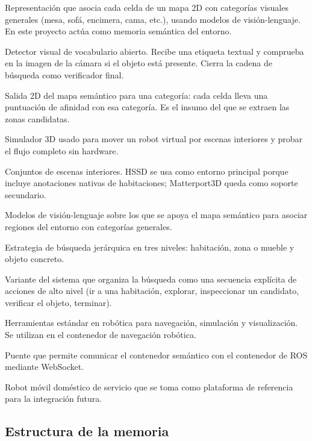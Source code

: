 \documentclass[11pt,fleqn,openany]{book} %
\begin{document}
\begin{description}[leftmargin=2.2em,style=nextline,itemsep=2pt]
  \item[VLMaps] Representación que asocia cada celda de un mapa 2D con categorías visuales generales (mesa, sofá, encimera, cama, etc.), usando modelos de visión-lenguaje. En este proyecto actúa como memoria semántica del entorno.
  \item[YOLOE] Detector visual de vocabulario abierto. Recibe una etiqueta textual y comprueba en la imagen de la cámara si el objeto está presente. Cierra la cadena de búsqueda como verificador final.
  \item[Mapa de calor semántico] Salida 2D del mapa semántico para una categoría: cada celda lleva una puntuación de afinidad con esa categoría. Es el insumo del que se extraen las zonas candidatas.
  \item[Habitat-Sim] Simulador 3D usado para mover un robot virtual por escenas interiores y probar el flujo completo sin hardware.
  \item[HSSD / Matterport3D] Conjuntos de escenas interiores. HSSD se usa como entorno principal porque incluye anotaciones nativas de habitaciones; Matterport3D queda como soporte secundario.
  \item[CLIP / LSeg] Modelos de visión-lenguaje sobre los que se apoya el mapa semántico para asociar regiones del entorno con categorías generales.
  \item[Razonamiento por habitaciones] Estrategia de búsqueda jerárquica en tres niveles: habitación, zona o mueble y objeto concreto.
  \item[Ejecutor estructurado] Variante del sistema que organiza la búsqueda como una secuencia explícita de acciones de alto nivel (ir a una habitación, explorar, inspeccionar un candidato, verificar el objeto, terminar).
  \item[ROS, Gazebo, RViz] Herramientas estándar en robótica para navegación, simulación y visualización. Se utilizan en el contenedor de navegación robótica.
  \item[rosbridge] Puente que permite comunicar el contenedor semántico con el contenedor de ROS mediante WebSocket.
  \item[Toyota HSR] Robot móvil doméstico de servicio que se toma como plataforma de referencia para la integración futura.
\end{description}

\subsection*{Estructura de la memoria}
\end{document}
